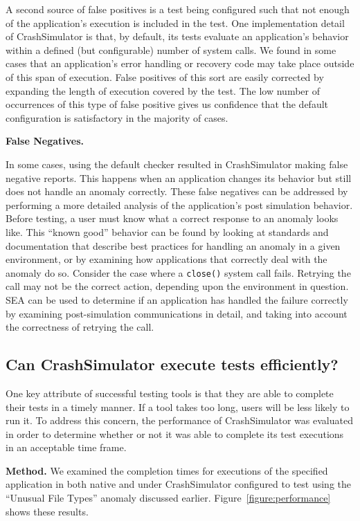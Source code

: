 A second source of false positives is a test being configured such that not
enough of the application's execution is included in the test.
One implementation detail of CrashSimulator is that,
by default,
its tests evaluate an application's behavior
within a defined (but configurable) number of system calls.
We found in some cases
that an application's error handling or recovery code
may take place outside of this span of execution.
False positives
of this sort
are easily corrected
by expanding the length of execution
covered by the test.
The low number of occurrences of this
type of false positive gives us confidence that the default configuration
is satisfactory in the majority of cases.

\textbf{False Negatives.}

In some cases,
using the default checker resulted
in CrashSimulator making false negative reports.
This happens when
an application changes its behavior
but still does not handle an anomaly correctly.
These false negatives can be addressed
by performing a more detailed analysis
of the application's post simulation behavior.
Before testing,
a user must know
what a correct response
to an anomaly looks like.
This ``known good'' behavior can be found
by looking at standards and documentation
that describe best practices for handling an anomaly
in a given environment,
or by examining how applications that correctly
deal with the anomaly do so.
Consider the case where a {\tt close()} system call fails.
Retrying the call may not be the correct action,
depending upon the environment in question.
SEA can be used to determine if an application
has handled the failure correctly
by examining post-simulation communications in detail,
and taking into account the correctness of retrying the call.

\subsection{Can CrashSimulator execute tests efficiently?}
\label{sec-perf}

One key attribute of successful testing tools is that they are able to
complete their tests in a timely manner.  If a tool takes too long,
users will be less likely to run it.
To address this concern, the performance of CrashSimulator was
evaluated in order to determine whether or not it was able to complete its
test executions in an acceptable time frame.

{\bf Method.}
We examined the completion
times for executions of the specified application in both
native and under CrashSimulator configured to test using the ``Unusual File
Types'' anomaly discussed earlier.
Figure~\ref{figure:performance} shows these results.

